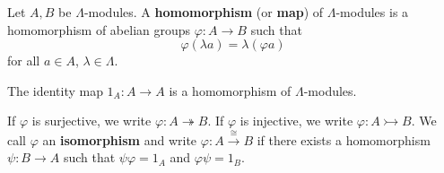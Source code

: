 Let $A, B$ be $\Lambda$-modules. A \textbf{homomorphism} (or \textbf{map}) of $\Lambda$-modules is a homomorphism of abelian groups $\varphi : A \to B$ such that
$$\varphi(\lambda a) = \lambda(\varphi a)$$
for all $a \in A$, $\lambda \in \Lambda$.

The identity map $1_A : A \to A$ is a homomorphism of $\Lambda$-modules.

If $\varphi$ is surjective, we write $\varphi : A \twoheadrightarrow B$. If $\varphi$ is injective, we write $\varphi : A \rightarrowtail B$. We call $\varphi$ an \textbf{isomorphism} and write $\varphi : A \xrightarrow{\cong} B$ if there exists a homomorphism $\psi : B \to A$ such that $\psi \varphi = 1_A$ and $\varphi \psi = 1_B$.

